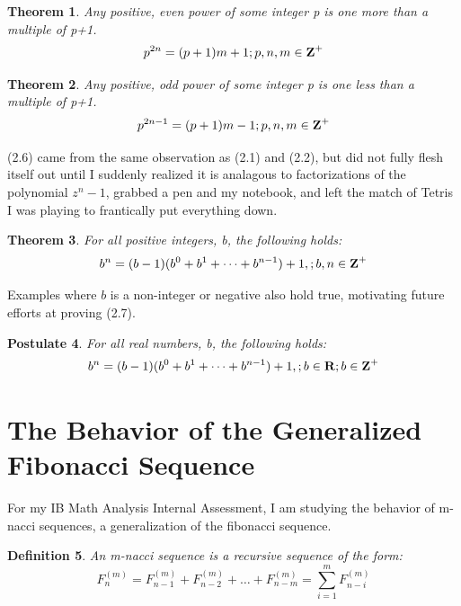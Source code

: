 \documentclass{article}
\newtheorem{theorem}{Theorem}[section]
\newtheorem{definition}[theorem]{Definition}
\newtheorem{postulate}[theorem]{Postulate}
\begin{document}
\begin{theorem}
    Any positive, even power of some integer \mbox{p} is one more than a multiple of \mbox{p+1}. 
    $$p^{2n}=(p+1)m+1;p,n,m\in\mbox{\textbf{Z}}^+$$
\end{theorem}

\begin{theorem}
    Any positive, odd power of some integer \mbox{p} is one less than a multiple of \mbox{p+1}. 
    $$p^{2n-1}=(p+1)m-1;p,n,m\in\mbox{\textbf{Z}}^+$$
\end{theorem}

(2.6) came from the same observation as (2.1) and (2.2), but did not fully flesh itself out until I suddenly realized it is analagous to factorizations of the polynomial $z^n-1$, grabbed a pen and my notebook, and left the match of Tetris I was playing to frantically put everything down. 

\begin{theorem}
    For all positive integers, b, the following holds:
    $$b^n=(b-1)(b^0+b^1+\dots+b^{n-1})+1,;b,n\in\mbox{\textbf{Z}}^+$$
\end{theorem}

Examples where $b$ is a non-integer or negative also hold true, motivating future efforts at proving (2.7).

\begin{postulate}
    For all real numbers, b, the following holds:
    $$b^n=(b-1)(b^0+b^1+\dots+b^{n-1})+1,;b\in\mbox{\textbf{R}};b\in\mbox{\textbf{Z}}^+$$
\end{postulate}

\section{The Behavior of the Generalized Fibonacci Sequence}

For my IB Math Analysis Internal Assessment, I am studying the behavior of m-nacci sequences, a generalization of the fibonacci sequence.

\begin{definition}
An m-nacci sequence is a recursive sequence of the form:
$$F^{(m)}_n=F^{(m)}_{n-1}+F^{(m)}_{n-2}+\dots+F^{(m)}_{n-m}=\sum_{i=1}^m F^{(m)}_{n-i}$$
\end{definition}
\end{document}
